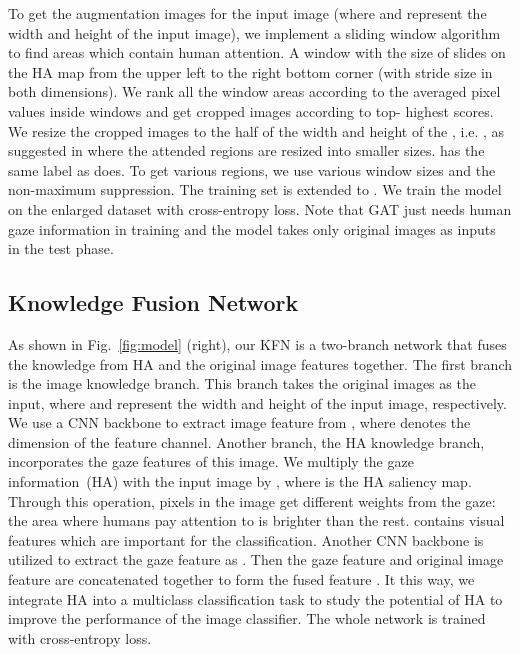 \documentclass{bmvc2k}
\begin{document}
To get the  augmentation images for the input image  (where  and  represent the width and height of the input image), we implement a sliding window algorithm to find areas which contain human attention. A window with the size of  slides on the HA map  from the upper left to the right bottom corner (with stride size  in both dimensions). We rank all the window areas according to the averaged pixel values inside windows and get  cropped images according to top- highest scores. We resize the cropped images to the half of the width and height of the , i.e. , as suggested in \cite{sermanet2014attention,fu2017look, zheng2017learning} where the attended regions are resized into smaller sizes.
 has the same label  as  does. To get various regions, we use various window sizes and the non-maximum suppression. The training set is extended to . We train the model on the enlarged dataset with cross-entropy loss. Note that GAT just needs human gaze information in training and the model takes only original images as inputs in the test phase. 
















\subsection{Knowledge Fusion Network}
\label{sec:KFN}
As shown in Fig.\ \ref{fig:model} (right), our KFN is a two-branch network that fuses the knowledge from HA and the original image features together.
The first branch is the image knowledge branch. This branch takes the original images  as the input, where  and  represent the width and height of the input image, respectively. We use a CNN backbone  to extract image feature  from , where  denotes the dimension of the feature channel. Another branch, the HA knowledge branch, incorporates the gaze features of this image. We multiply the gaze information~(HA) with the input image by , where  is the HA saliency map. Through this operation, pixels in the image get different weights from the gaze: the area where humans pay attention to is brighter than the rest.  contains visual features which are important for the classification. Another CNN backbone  is utilized to extract the gaze feature as . Then the gaze feature and original image feature are concatenated together to form the fused feature . It this way, we integrate HA into a multiclass classification task to study the potential of HA to improve the performance of the image classifier. The whole network is trained with cross-entropy loss.
\end{document}
